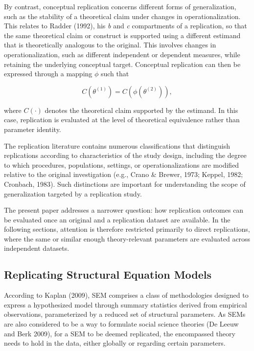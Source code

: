 \documentclass[
  12pt,
  letterpaper,
  man]{apa7}
\begin{document}
By contrast, conceptual replication concerns different forms of
generalization, such as the stability of a theoretical claim under
changes in operationalization. This relates to Radder (1992), his
\emph{b} and \emph{c} compartments of a replication, so that the same
theoretical claim or construct is supported using a different estimand
that is theoretically analogous to the original. This involves changes
in operationalization, such as different independent or dependent
measures, while retaining the underlying conceptual target. Conceptual
replication can then be expressed through a mapping \(\phi\) such that

\[C(\theta^{(1)}) = C(\phi(\theta^{(2)})), \]

where \(C(\cdot)\) denotes the theoretical claim supported by the
estimand. In this case, replication is evaluated at the level of
theoretical equivalence rather than parameter identity.

The replication literature contains numerous classifications that
distinguish replications according to characteristics of the study
design, including the degree to which procedures, populations, settings,
or operationalizations are modified relative to the original
investigation (e.g., Crano \& Brewer, 1973; Keppel, 1982; Cronbach,
1983). Such distinctions are important for understanding the scope of
generalization targeted by a replication study.

The present paper addresses a narrower question: how replication
outcomes can be evaluated once an original and a replication dataset are
available. In the following sections, attention is therefore restricted
primarily to direct replications, where the same or similar enough
theory-relevant parameters are evaluated across independent datasets.

\subsection{Replicating Structural Equation
Models}\label{replicating-structural-equation-models}

According to Kaplan (2009), SEM comprises a class of methodologies
designed to express a hypothesized model through summary statistics
derived from empirical observations, parameterized by a reduced set of
structural parameters. As SEMs are also considered to be a way to
formulate social science theories (De Leeuw and Berk 2009), for a SEM to
be deemed replicated, the encompassed theory needs to hold in the data,
either globally or regarding certain parameters.
\end{document}
